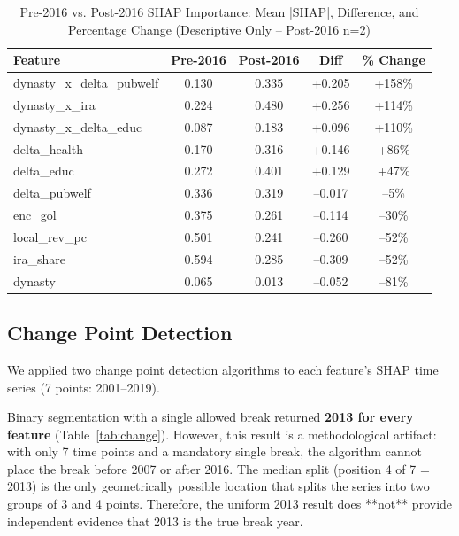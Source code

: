 \documentclass[conference]{IEEEtran}
\begin{document}
\begin{table}[htbp]
\caption{Pre-2016 vs. Post-2016 SHAP Importance: Mean |SHAP|, Difference, and Percentage Change (Descriptive Only – Post-2016 n=2)}
\centering
\renewcommand{\tabcolsep}{2.5pt}
\begin{tabular}{lcccc}
\toprule
\textbf{Feature} & \textbf{Pre-2016} & \textbf{Post-2016} & \textbf{Diff} & \textbf{\% Change} \\
\midrule
dynasty\_x\_delta\_pubwelf   & 0.130 & 0.335 & +0.205 & +158\% \\
dynasty\_x\_ira             & 0.224 & 0.480 & +0.256 & +114\% \\
dynasty\_x\_delta\_educ      & 0.087 & 0.183 & +0.096 & +110\% \\
delta\_health               & 0.170 & 0.316 & +0.146 & +86\% \\
delta\_educ                 & 0.272 & 0.401 & +0.129 & +47\% \\
delta\_pubwelf              & 0.336 & 0.319 & –0.017 & –5\% \\
enc\_gol                    & 0.375 & 0.261 & –0.114 & –30\% \\
local\_rev\_pc              & 0.501 & 0.241 & –0.260 & –52\% \\
ira\_share                  & 0.594 & 0.285 & –0.309 & –52\% \\
dynasty                     & 0.065 & 0.013 & –0.052 & –81\% \\
\bottomrule
\end{tabular}
\label{tab:drift}
\end{table}

\subsection{Change Point Detection}
We applied two change point detection algorithms to each feature’s SHAP time series (7 points: 2001–2019). 

Binary segmentation with a single allowed break returned \textbf{2013 for every feature} (Table~\ref{tab:change}). However, this result is a methodological artifact: with only 7 time points and a mandatory single break, the algorithm cannot place the break before 2007 or after 2016. The median split (position 4 of 7 = 2013) is the only geometrically possible location that splits the series into two groups of 3 and 4 points. Therefore, the uniform 2013 result does **not** provide independent evidence that 2013 is the true break year.
\end{document}
